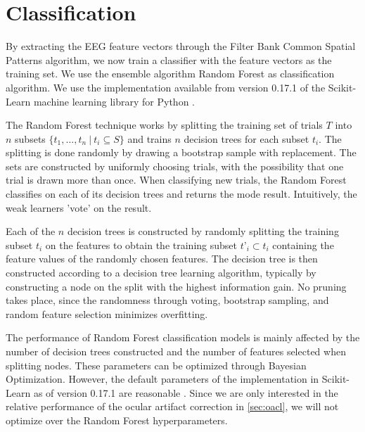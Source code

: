 \section{Classification}\label{sec:randomforest}
By extracting the EEG feature vectors through the Filter Bank Common Spatial Patterns algorithm, we now train a classifier with the feature vectors as the training set.
We use the ensemble algorithm Random Forest as classification algorithm. We use the implementation available from version 0.17.1 of the Scikit-Learn machine learning library for Python \cite{scikit-learn}.

The Random Forest technique works by splitting the training set of trials $T$ into $n$ subsets $\{t_1,…,t_n \ | \ t_i \subseteq S\}$ and trains $n$ decision trees for each subset $t_i$. The splitting is done randomly by drawing a bootstrap sample with replacement. The sets are constructed by uniformly choosing trials, with the possibility that one trial is drawn more than once. When classifying new trials, the Random Forest classifies on each of its decision trees and returns the mode result. Intuitively, the weak learners 'vote' on the result.

Each of the $n$ decision trees is constructed by randomly splitting the training subset $t_i$ on the features to obtain the training subset $t’_i \subset t_i$ containing the feature values of the randomly chosen features. The decision tree is then constructed according to a decision tree learning algorithm, typically by constructing a node on the split with the highest information gain. No pruning takes place, since the randomness through voting, bootstrap sampling, and random feature selection minimizes overfitting.

The performance of Random Forest classification models is mainly affected by the number of decision trees constructed and the number of features selected when splitting nodes. These parameters can be optimized through Bayesian Optimization. However, the default parameters of the implementation in Scikit-Learn \citep{scikit-learn} as of version 0.17.1 are reasonable \citep{bernard2009influence}. Since we are only interested in the relative performance of the ocular artifact correction in \cref{sec:oacl}, we will not optimize over the Random Forest hyperparameters.